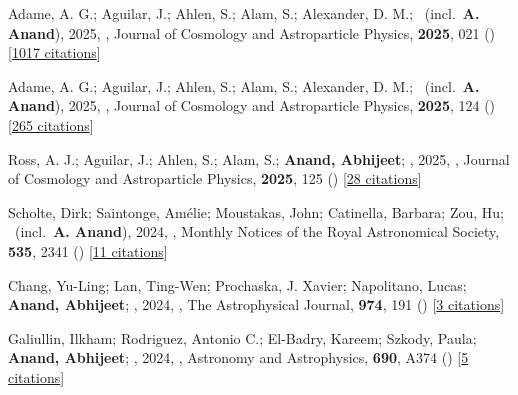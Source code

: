 \item[{\color{numcolor}\scriptsize14}] Adame, A. G.; Aguilar, J.; Ahlen, S.; Alam, S.; Alexander, D. M.; \etal\ (incl.\ \textbf{A. Anand}), 2025, , Journal of Cosmology and Astroparticle Physics, \textbf{2025}, 021 () [\href{https://ui.adsabs.harvard.edu/abs/2025JCAP...02..021A}{1017 citations}]

\item[{\color{numcolor}\scriptsize13}] Adame, A. G.; Aguilar, J.; Ahlen, S.; Alam, S.; Alexander, D. M.; \etal\ (incl.\ \textbf{A. Anand}), 2025, , Journal of Cosmology and Astroparticle Physics, \textbf{2025}, 124 () [\href{https://ui.adsabs.harvard.edu/abs/2025JCAP...01..124A}{265 citations}]

\item[{\color{numcolor}\scriptsize12}] Ross, A. J.; Aguilar, J.; Ahlen, S.; Alam, S.; \textbf{Anand, Abhijeet}; \etal, 2025, , Journal of Cosmology and Astroparticle Physics, \textbf{2025}, 125 () [\href{https://ui.adsabs.harvard.edu/abs/2025JCAP...01..125R}{28 citations}]

\item[{\color{numcolor}\scriptsize11}] Scholte, Dirk; Saintonge, Am{\'e}lie; Moustakas, John; Catinella, Barbara; Zou, Hu; \etal\ (incl.\ \textbf{A. Anand}), 2024, , Monthly Notices of the Royal Astronomical Society, \textbf{535}, 2341 () [\href{https://ui.adsabs.harvard.edu/abs/2024MNRAS.535.2341S}{11 citations}]

\item[{\color{numcolor}\scriptsize10}] Chang, Yu-Ling; Lan, Ting-Wen; Prochaska, J. Xavier; Napolitano, Lucas; \textbf{Anand, Abhijeet}; \etal, 2024, , The Astrophysical Journal, \textbf{974}, 191 () [\href{https://ui.adsabs.harvard.edu/abs/2024ApJ...974..191C}{3 citations}]

\item[{\color{numcolor}\scriptsize9}] Galiullin, Ilkham; Rodriguez, Antonio C.; El-Badry, Kareem; Szkody, Paula; \textbf{Anand, Abhijeet}; \etal, 2024, , Astronomy and Astrophysics, \textbf{690}, A374 () [\href{https://ui.adsabs.harvard.edu/abs/2024A&A...690A.374G}{5 citations}]

